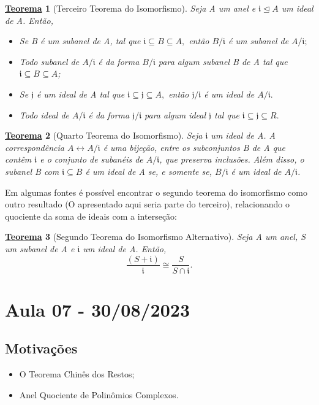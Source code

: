\documentclass{article}
\newtheorem*{theorem*}{\underline{Teorema}}
\begin{document}
    \begin{theorem*}[Terceiro Teorema do Isomorfismo]
      Seja A um anel e \(\mathfrak{i} \trianglelefteq{A}\) um ideal de A. Então, 
      \begin{itemize}
        \item[i)] Se B é um subanel de A, tal que \(\mathfrak{i}\subseteq B\subseteq A,\) então \(B/\mathfrak{i}\) é um
          subanel de \(A/\mathfrak{i};\)
        \item[ii)] Todo subanel de \(A/\mathfrak{i}\) é da forma \(B/\mathfrak{i}\) para algum subanel B de A tal que
          \(\mathfrak{i} \subseteq B \subseteq A\);
        \item[iii)] Se \(\mathfrak{j}\) é um ideal de A tal que \(\mathfrak{i}\subseteq \mathfrak{j}\subseteq A,\) então
          \(\mathfrak{j}/\mathfrak{i}\) é um ideal de \(A/\mathfrak{i}.\)
        \item[iv)] Todo ideal de \(A/\mathfrak{i}\) é da forma \(\mathfrak{j}/\mathfrak{i}\) para algum ideal \(\mathfrak{j}\) tal que
          \(\mathfrak{i}\subseteq \mathfrak{j}\subseteq R.\) 
      \end{itemize}
    \end{theorem*}
    \begin{theorem*}[Quarto Teorema do Isomorfismo]
      Seja \(\mathfrak{i}\) um ideal de A. A correspondência \(A\longleftrightarrow A/\mathfrak{i}\) é uma bijeção, entre os subconjuntos B de A que contêm \(\mathfrak{i}\) e o 
      conjunto de subanéis de \(A/\mathfrak{i}\), que preserva inclusões. Além disso, o subanel B com \(\mathfrak{i} \subseteq B\) é um ideal de A se, e somente se,
      \(B/\mathfrak{i}\) é um ideal de \(A/\mathfrak{i}\).
    \end{theorem*}
    Em algumas fontes é possível encontrar o segundo teorema do isomorfismo como outro resultado (O apresentado aqui seria parte do terceiro), relacionando o quociente da soma de ideais
    com a interseção:
    \begin{theorem*}[Segundo Teorema do Isomorfismo Alternativo]
      Seja A um anel, S um subanel de A e \(\mathfrak{i}\) um ideal de A. Então, 
      \[
        \frac{(S+\mathfrak{i})}{\mathfrak{i}}\cong{\frac{S}{S\cap \mathfrak{i}}}.
      \]
    \end{theorem*}
    \newpage

    \section{Aula 07 - 30/08/2023}
    \subsection{Motivações}
    \begin{itemize}
      \item O Teorema Chinês dos Restos;
      \item Anel Quociente de Polinômios Complexos.
    \end{itemize}
\end{document}
